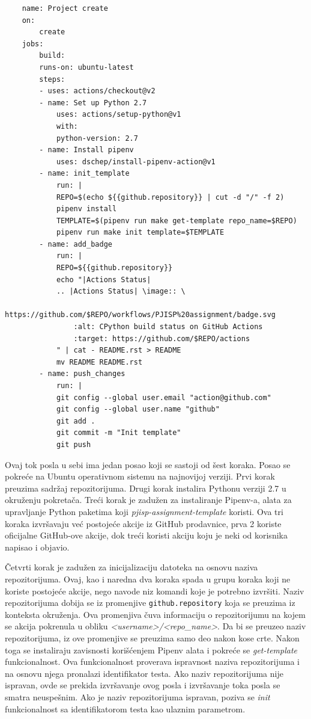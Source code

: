 \documentclass[12pt]{report}
\begin{document}
\begin{verbatim}
    name: Project create
    on:
        create
    jobs:
        build:
        runs-on: ubuntu-latest
        steps:
        - uses: actions/checkout@v2
        - name: Set up Python 2.7
            uses: actions/setup-python@v1
            with:
            python-version: 2.7
        - name: Install pipenv
            uses: dschep/install-pipenv-action@v1
        - name: init_template
            run: |
            REPO=$(echo ${{github.repository}} | cut -d "/" -f 2)
            pipenv install
            TEMPLATE=$(pipenv run make get-template repo_name=$REPO)
            pipenv run make init template=$TEMPLATE
        - name: add_badge
            run: |
            REPO=${{github.repository}}
            echo "|Actions Status|
            .. |Actions Status| \image:: \
                https://github.com/$REPO/workflows/PJISP%20assignment/badge.svg
                :alt: CPython build status on GitHub Actions
                :target: https://github.com/$REPO/actions
            " | cat - README.rst > README
            mv README README.rst
        - name: push_changes
            run: |
            git config --global user.email "action@github.com"
            git config --global user.name "github"
            git add .
            git commit -m "Init template"
            git push
\end{verbatim}

Ovaj tok posla u sebi ima jedan posao koji se sastoji od šest koraka. Posao se pokreće na Ubuntu operativnom sistemu na najnovijoj verziji. Prvi korak preuzima sadržaj repozitorijuma. Drugi korak instalira Pythonu verziji 2.7 u okruženju pokretača. Treći korak je zadužen za instaliranje Pipenv-a, alata za upravljanje Python paketima koji \textit{pjisp-assignment-template} koristi. Ova tri koraka izvršavaju već postojeće akcije iz GitHub prodavnice, prva 2 koriste oficijalne GitHub-ove akcije, dok treći koristi akciju koju je neki od korisnika napisao i objavio.

Četvrti korak je zadužen za inicijalizaciju datoteka na osnovu naziva repozitorijuma. Ovaj, kao i naredna dva koraka spada u grupu koraka koji ne koriste postojeće akcije, nego navode niz komandi koje je potrebno izvršiti. Naziv repozitorijuma dobija se iz promenjive \texttt{github.repository} koja se preuzima iz konteksta okruženja. Ova promenjiva čuva informaciju o repozitorijumu na kojem se akcija pokrenula u obliku \textit{<username>/<repo\_name>}. Da bi se preuzeo naziv repozitorijuma, iz ove promenjive se preuzima samo deo nakon kose crte. Nakon toga se instaliraju zavisnosti korišćenjem Pipenv alata i pokreće se \textit{get-template} funkcionalnost. Ova funkcionalnost proverava ispravnost naziva repozitorijuma i na osnovu njega pronalazi identifikator testa. Ako naziv repozitorijuma nije ispravan, ovde se prekida izvršavanje ovog posla i izvršavanje toka posla se smatra neuspešnim. Ako je naziv repozitorijuma ispravan, poziva se \textit{init} funkcionalnost sa identifikatorom testa kao ulaznim parametrom.
\end{document}

